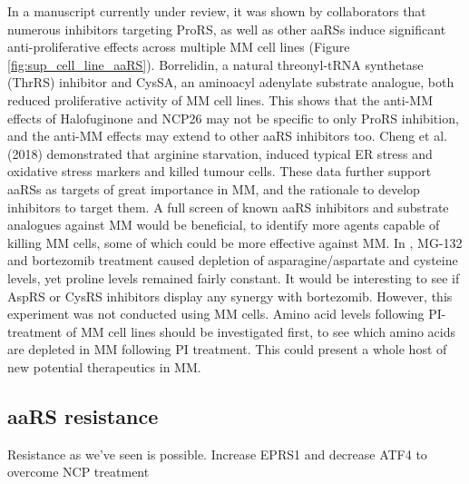 \noindent
In a manuscript currently under review, it was shown by collaborators that numerous inhibitors targeting ProRS, as well as other aaRSs induce significant anti-proliferative effects across multiple MM cell lines (Figure \ref{fig:sup_cell_line_aaRS})\cite{bottpreclinical2022}.
Borrelidin, a natural threonyl-tRNA synthetase (ThrRS) inhibitor and CysSA, an aminoacyl adenylate substrate analogue, both reduced proliferative activity of MM cell lines.
This shows that the anti-MM effects of Halofuginone and NCP26 may not be specific to only ProRS inhibition, and the anti-MM effects may extend to other aaRS inhibitors too.
Cheng et al. (2018) demonstrated that arginine starvation, induced typical ER stress and oxidative stress markers and killed tumour cells\cite{cheng2018arginine}.
These data further support aaRSs as targets of great importance in MM, and the rationale to develop inhibitors to target them.
A full screen of known aaRS inhibitors and substrate analogues against MM would be beneficial, to identify more agents capable of killing MM cells, some of which could be more effective against MM\@.
In \cite{suraweera2012failure}, MG-132 and bortezomib treatment caused depletion of asparagine/aspartate and cysteine levels, yet proline levels remained fairly constant.
It would be interesting to see if AspRS or CysRS inhibitors display any synergy with bortezomib.
However, this experiment was not conducted using MM cells.
Amino acid levels following PI-treatment of MM cell lines should be investigated first, to see which amino acids are depleted in MM following PI treatment.
This could present a whole host of new potential therapeutics in MM\@.

\subsection{aaRS resistance}
Resistance as we've seen is possible. Increase EPRS1 and decrease ATF4 to overcome NCP treatment



